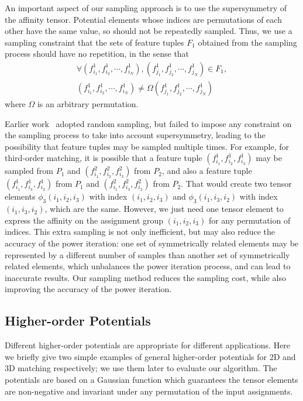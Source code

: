 An important aspect of our sampling approach is to use the supersymmetry of the affinity tensor. Potential elements whose indices are permutations of each other
have the same value, so should not be repeatedly sampled.
Thus, we use a sampling constraint that the sets of feature tuples $F_1$ obtained from the sampling process should have no repetition, in the sense that
\begin{eqnarray}
\label{equ:noredun2}
\forall (f_{i_1}^1,f_{i_2}^1,\cdots,f_{i_N}^1),(f_{j_1}^1,f_{j_2}^1,\cdots,f_{j_N}^1) \in F_1,\nonumber\\ (f_{i_1}^1,f_{i_2}^1,\cdots,f_{i_N}^1)\neq\Omega(f_{j_1}^1,f_{j_2}^1,\cdots,f_{j_N}^1)
\end{eqnarray}
where $\Omega$ is an arbitrary permutation.

Earlier work~\cite{Zass08,Duchenne09,Aiping10} adopted random sampling,
but failed to impose any constraint on the sampling process to take into account supersymmetry,
leading to the possibility that feature tuples may be sampled multiple times.
For example, for third-order matching, it is possible that a feature tuple $(f_{i_1}^1, f_{i_2}^1, f_{i_3}^1)$ may be sampled from $P_1$ and $(f_{i_1}^2, f_{i_2}^2, f_{i_3}^2)$ from $P_2$,
and also a feature tuple $(f_{i_1}^1, f_{i_3}^1, f_{i_2}^1)$  from $P_1$ and $(f_{i_1}^2, f_{i_3}^2, f_{i_2}^2)$ from $P_2$. That would create two tensor elements $\phi_3({i_1}, {i_2}, {i_3})$ with index $({i_1}, {i_2}, {i_3})$ and $\phi_3({i_1}, {i_3}, {i_2})$ with index $({i_1}, {i_3}, {i_2})$, which are the same. However, we just need one tensor element to express the affinity on the assignment group $({i_1}, {i_2}, {i_3})$ for any permutation of indices.
This extra sampling is not only inefficient, but may also reduce the accuracy of the power iteration: one set of symmetrically related elements  may be represented by a different number of samples than another set of  symmetrically related elements, which unbalances the power iteration process, and can lead to inaccurate results.
Our sampling method reduces the sampling cost, while also improving the accuracy of the power iteration.

\subsection{Higher-order Potentials}
\label{subsec:potentials}

Different higher-order potentials are appropriate for different applications.
Here we briefly give two simple examples of general higher-order potentials for  2D and 3D matching respectively; we  use them later to evaluate our algorithm.
The potentials are based on a Gaussian function
which guarantees the tensor elements are non-negative and invariant under any permutation of the input assignments.

